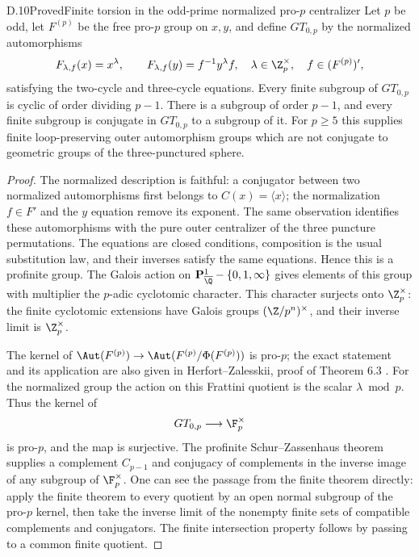 \begin{claim}{D.10}{Proved}{Finite torsion in the odd-prime normalized pro-$p$ centralizer}
Let $p$ be odd, let $F^{(p)}$ be the free pro-$p$ group on $x,y$, and define $GT_{0,p}$ by the normalized automorphisms
\[
 F_{\lambda,f}(x)=x^\lambda,\qquad
 F_{\lambda,f}(y)=f^{-1}y^\lambda f,
 \quad \lambda\in\Z_p^\times,\quad f\in(F^{(p)})',
\]
satisfying the two-cycle and three-cycle equations. Every finite subgroup of $GT_{0,p}$ is cyclic of order dividing $p-1$. There is a subgroup of order $p-1$, and every finite subgroup is conjugate in $GT_{0,p}$ to a subgroup of it. For $p\geq5$ this supplies finite loop-preserving outer automorphism groups which are not conjugate to geometric groups of the three-punctured sphere.
\end{claim}
\begin{proof}
The normalized description is faithful: a conjugator between two normalized automorphisms first belongs to $C(x)=\langle x\rangle$; the normalization $f\in F'$ and the $y$ equation remove its exponent. The same observation identifies these automorphisms with the pure outer centralizer of the three puncture permutations. The equations are closed conditions, composition is the usual substitution law, and their inverses satisfy the same equations. Hence this is a profinite group. The Galois action on $\mathbf P^1_{\overline\Q}-\{0,1,\infty\}$ gives elements of this group with multiplier the $p$-adic cyclotomic character. This character surjects onto $\Z_p^\times$: the finite cyclotomic extensions have Galois groups $(\Z/p^n)^\times$, and their inverse limit is $\Z_p^\times$.

The kernel of $\Aut(F^{(p)})\to\Aut(F^{(p)}/\Phi(F^{(p)}))$ is pro-$p$; the exact statement and its application are also given in Herfort--Zalesskii, proof of Theorem 6.3 \cite{R-HZ}. For the normalized group the action on this Frattini quotient is the scalar $\lambda\bmod p$. Thus the kernel of
\[
 GT_{0,p}\longrightarrow\F_p^\times
\]
is pro-$p$, and the map is surjective. The profinite Schur--Zassenhaus theorem supplies a complement $C_{p-1}$ and conjugacy of complements in the inverse image of any subgroup of $\F_p^\times$. One can see the passage from the finite theorem directly: apply the finite theorem to every quotient by an open normal subgroup of the pro-$p$ kernel, then take the inverse limit of the nonempty finite sets of compatible complements and conjugators. The finite intersection property follows by passing to a common finite quotient.


\end{proof}

